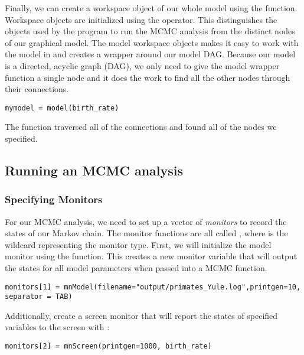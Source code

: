 Finally, we can create a workspace object of our whole model using the  function. 
Workspace objects are initialized using the \cl{=} operator. This distinguishes the objects used by the program to run the MCMC analysis from the distinct nodes of our graphical model.
The model workspace objects makes it easy to work with the model in \Rev and creates a wrapper around our model DAG. 
Because our model is a directed, acyclic graph (DAG), we only need to give the model wrapper function a single node and it does the work to find all the other nodes through their connections.
{\tt \begin{snugshade*}
\begin{lstlisting}
mymodel = model(birth_rate)
\end{lstlisting}
\end{snugshade*}}

The  function traversed all of the connections and found all of the nodes we specified. 


\subsection{Running an MCMC analysis}

\subsubsection{Specifying Monitors}

For our MCMC analysis, we need to set up a vector of \textit{monitors} to record the states of our Markov chain. 
The monitor functions are all called , where \cl{*} is the wildcard representing the monitor type.
First, we will initialize the model monitor using the  function. This creates a new monitor variable that will output the states for all model parameters when passed into a MCMC function. 
{\tt \begin{snugshade*}
\begin{lstlisting}
monitors[1] = mnModel(filename="output/primates_Yule.log",printgen=10, separator = TAB)
\end{lstlisting}
\end{snugshade*}}

Additionally, create a screen monitor that will report the states of specified variables to the screen with :
{\tt \begin{snugshade*}
\begin{lstlisting}
monitors[2] = mnScreen(printgen=1000, birth_rate)
\end{lstlisting}
\end{snugshade*}}

